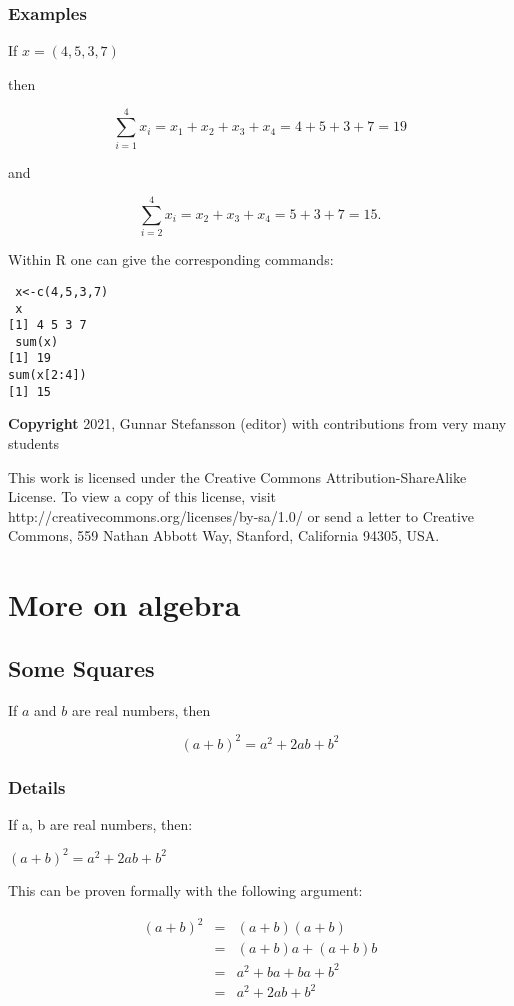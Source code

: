 \documentclass[12pt,a4paper]{article}
\theoremstyle{regla}
\theoremstyle{remark}
\theoremstyle{definition}
\theoremstyle{nonumberbreak}
\begin{document}
\subsubsection{Examples}
\begin{xmpl}
If $x=(4,5,3,7)$

then

$$\sum_{i=1}^{4} x_i = x_1+x_2+x_3+x_4 = 4+5+3+7 = 19
$$

and

$$
\sum_{i=2}^{4} x_i = x_2+x_3+x_4 = 5+3+7 = 15 .
$$

Within R one can give the corresponding commands:
\begin{lstlisting}
 x<-c(4,5,3,7)
 x
[1] 4 5 3 7
 sum(x)
[1] 19
sum(x[2:4])
[1] 15

\end{lstlisting}
\end{xmpl}

{\bf Copyright}
2021, Gunnar Stefansson (editor) with contributions from very many students

This work is licensed under the Creative Commons
Attribution-ShareAlike License. To view a copy of this license, visit
http://creativecommons.org/licenses/by-sa/1.0/ or send a letter to
Creative Commons, 559 Nathan Abbott Way, Stanford, California 94305,
USA.
\clearpage
\section{More on algebra}
\subsection{Some Squares}
\begin{fbox}
\begin{minipage}{0.97\textwidth}
If $a$ and $b$ are real numbers, then 

$$
(a+b)^2=a^2+2ab+b^2
$$
\end{minipage}
\end{fbox}
\subsubsection{Details}
If a, b are real numbers, then:

$(a+b)^2=a^2+2ab+b^2$

This can be proven formally with the following argument:

\begin{eqnarray*} 
(a+b)^2 &=& (a+b)(a+b)\\
       &=&( a+b)a+(a+b)b\\
       &=& a^2+ba+ba+b^2\\
       &=& a^2+2ab+b^2
\end{eqnarray*}
\end{document}
